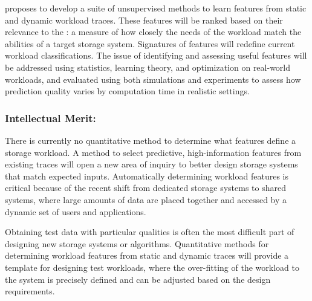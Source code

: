 \begin{myitemize}
%
proposes to develop a suite of unsupervised methods to learn features from
static and dynamic workload
traces.  These features will be ranked based on their relevance to the
\systemfit: a measure of how closely the needs of the workload match the
abilities of a target storage system.   Signatures of features will redefine current workload
classifications.
The issue of identifying and assessing useful features will be addressed using
statistics, learning theory, and optimization on 
real-world workloads, and evaluated using both simulations and experiments to assess how prediction quality varies
by computation time in realistic settings.
\end{myitemize}

\subsubsection*{Intellectual Merit: }

There is currently no quantitative method to determine what features define a
storage workload. A method to select
predictive, high-information features from existing traces will open a new area of
inquiry to better design storage systems that match
expected inputs.  Automatically determining workload features is critical
because of the recent shift from dedicated storage systems to shared systems,
where large amounts of data are placed together and accessed by a dynamic set of
users and applications.

Obtaining test data with particular qualities is often the most difficult part of
designing new storage systems or algorithms.
Quantitative methods for determining workload features from static and dynamic
traces will provide a template for designing test workloads, where the
over-fitting of the workload to the system is precisely defined and can be
adjusted based on the design requirements.

